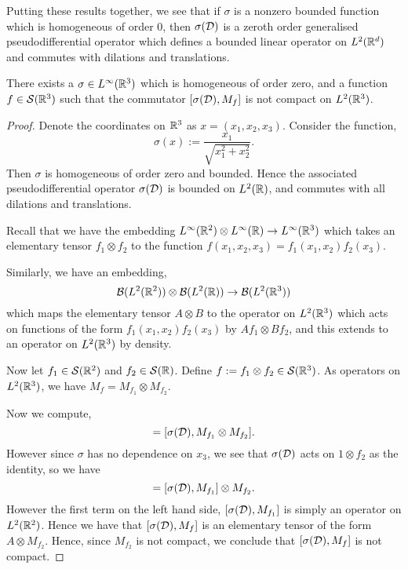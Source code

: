 \documentclass{unswmaths}
\begin{document}
Putting these results together, we see that if $\sigma$ is a nonzero
bounded function which is homogeneous of order $0$,
then $\sigma(\mathcal{D})$ is a zeroth order generalised pseudodifferential operator which defines
a bounded linear operator on $L^2(\mathbb{R}^d)$ and commutes with dilations and translations.

\begin{proposition}
    There exists a $\sigma \in L^\infty(\mathbb{R}^3)$ which
    is homogeneous of order zero, and a function $f \in \mathcal{S}(\mathbb{R}^3)$
    such that the commutator $[\sigma(\mathcal{D}),M_f]$ is not compact on $L^2(\mathbb{R}^3)$.
\end{proposition}
\begin{proof}
    Denote the coordinates on $\mathbb{R}^3$ as $x = (x_1,x_2,x_3)$. Consider
    the function,
    \begin{equation}
        \sigma(x) := \frac{x_1}{\sqrt{x_1^2+x_2^2}}.
    \end{equation}
    Then $\sigma$ is homogeneous of order zero and bounded. Hence the associated
    pseudodifferential operator $\sigma(\mathcal{D})$ is bounded on $L^2(\mathbb{R})$, and commutes
    with all dilations and translations.
    

    Recall that we have the embedding $L^\infty(\mathbb{R}^2)\otimes L^\infty(\mathbb{R}) \rightarrow L^\infty(\mathbb{R}^3)$
    which takes an elementary tensor $f_1\otimes f_2$ to the function $f(x_1,x_2,x_3) = f_1(x_1,x_2)f_2(x_3)$. 
    
    Similarly, we have an embedding,
    \begin{equation}
        \mathcal{B}(L^2(\mathbb{R}^2))\otimes \mathcal{B}(L^2(\mathbb{R})) \rightarrow \mathcal{B}(L^2(\mathbb{R}^3))
    \end{equation}
    which maps the elementary tensor $A \otimes B$ to the operator
    on $L^2(\mathbb{R}^3)$ which acts on functions of the form $f_1(x_1,x_2)f_2(x_3)$
    by $Af_1 \otimes Bf_2$, and this extends to an operator on $L^2(\mathbb{R}^3)$
    by density.    
    
    Now let $f_1 \in \mathcal{S}(\mathbb{R}^2)$ and $f_2 \in \mathcal{S}(\mathbb{R})$. Define $f := f_1\otimes f_2 \in \mathcal{S}(\mathbb{R}^3)$. 
    As operators on $L^2(\mathbb{R}^3)$, we have $M_f = M_{f_1}\otimes M_{f_2}$.
    
    Now we compute,
    \begin{equation}
        [\sigma(\iD),M_f] = [\sigma(\iD),M_{f_1}\otimes M_{f_2}]. 
    \end{equation}   
    However since $\sigma$ has no dependence on $x_3$, we see that $\sigma(\mathcal{D})$
    acts on $1\otimes f_2$ as the identity, so we have
    \begin{equation}
        [\sigma(\iD),M_f] = [\sigma(\iD),M_{f_1}]\otimes M_{f_2}.
    \end{equation}
    However the first term on the left hand side, $[\sigma(\mathcal{D}),M_{f_1}]$
    is simply an operator on $L^2(\mathbb{R}^2)$. Hence we have that $[\sigma(\mathcal{D}),M_f]$
    is an elementary tensor of the form $A \otimes M_{f_2}$. Hence, since $M_{f_2}$
    is not compact, we conclude that $[\sigma(\mathcal{D}),M_f]$ is not compact.
\end{proof}
\end{document}
